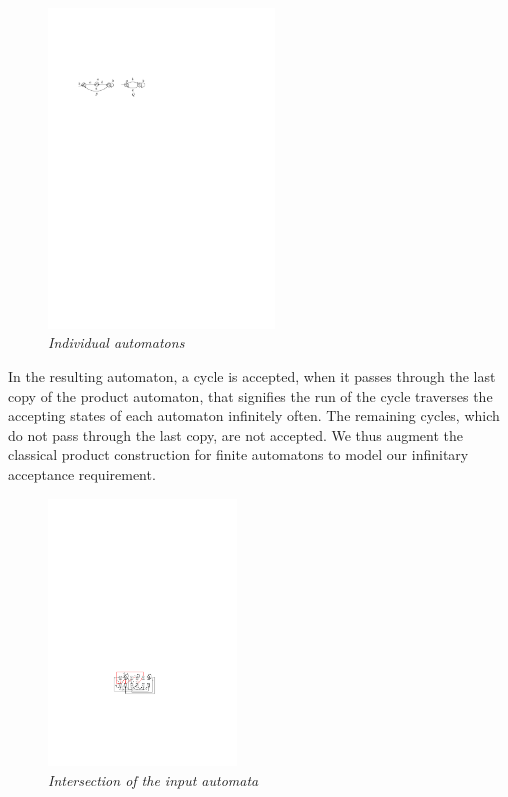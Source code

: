 \begin{figure}
\begin{center}
\includegraphics[width=60mm]{example_1.pdf}

\caption{{\em Individual automatons}} \label{fig1}
\end{center}
\end{figure}
 

\noindent
 In the resulting automaton, a cycle is accepted, when it passes through the last copy
 of the product automaton, that signifies the run of the cycle traverses the accepting states of each automaton infinitely often. The remaining cycles, 
 which do not pass through the last copy, are not accepted. We thus augment the classical product construction for finite automatons to model our infinitary acceptance requirement.

 
 \begin{figure}
\begin{center}
\includegraphics[width=50mm]{state_copy_transition_cycle.pdf}
\end{center}
\caption{{\em Intersection of the input automata}}
\label{transition}
\end{figure}

